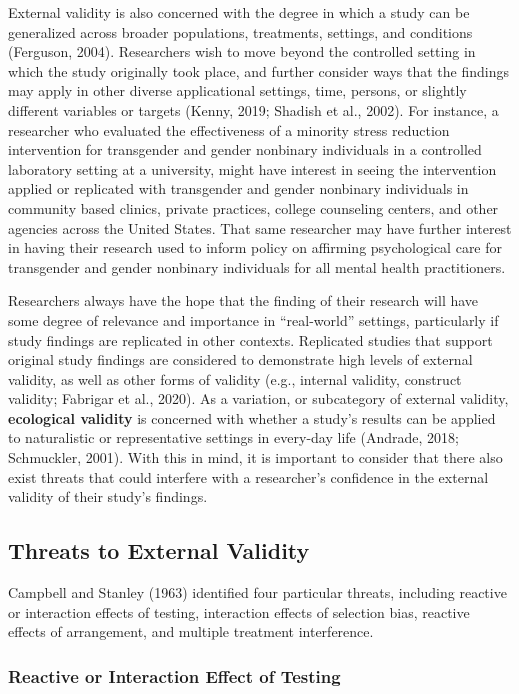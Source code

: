 \documentclass[
  11pt,
]{book}
\begin{document}
External validity is also concerned with the degree in which a study can be generalized across broader populations, treatments, settings, and conditions (Ferguson, 2004). Researchers wish to move beyond the controlled setting in which the study originally took place, and further consider ways that the findings may apply in other diverse applicational settings, time, persons, or slightly different variables or targets (Kenny, 2019; Shadish et al., 2002). For instance, a researcher who evaluated the effectiveness of a minority stress reduction intervention for transgender and gender nonbinary individuals in a controlled laboratory setting at a university, might have interest in seeing the intervention applied or replicated with transgender and gender nonbinary individuals in community based clinics, private practices, college counseling centers, and other agencies across the United States. That same researcher may have further interest in having their research used to inform policy on affirming psychological care for transgender and gender nonbinary individuals for all mental health practitioners.

Researchers always have the hope that the finding of their research will have some degree of relevance and importance in ``real-world'' settings, particularly if study findings are replicated in other contexts. Replicated studies that support original study findings are considered to demonstrate high levels of external validity, as well as other forms of validity (e.g., internal validity, construct validity; Fabrigar et al., 2020). As a variation, or subcategory of external validity, \textbf{ecological validity} is concerned with whether a study's results can be applied to naturalistic or representative settings in every-day life (Andrade, 2018; Schmuckler, 2001). With this in mind, it is important to consider that there also exist threats that could interfere with a researcher's confidence in the external validity of their study's findings.

\subsection{Threats to External Validity}\label{threats-to-external-validity}

Campbell and Stanley (1963) identified four particular threats, including reactive or interaction effects of testing, interaction effects of selection bias, reactive effects of arrangement, and multiple treatment interference.

\subsubsection{Reactive or Interaction Effect of Testing}\label{reactive-or-interaction-effect-of-testing}
\end{document}
